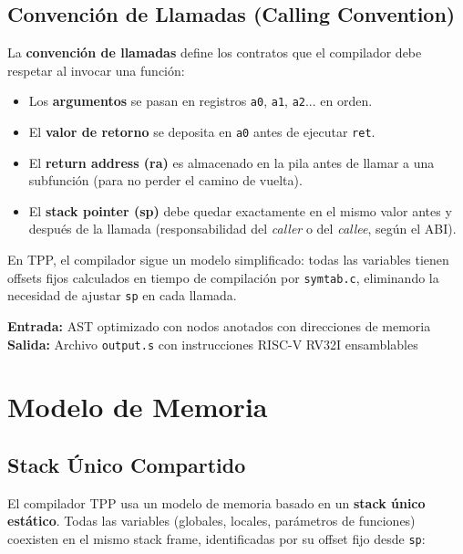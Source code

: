 \subsection{Convención de Llamadas (Calling Convention)}

La \textbf{convención de llamadas} define los contratos que el compilador debe respetar al invocar una función:
\begin{itemize}
    \item Los \textbf{argumentos} se pasan en registros \texttt{a0}, \texttt{a1}, \texttt{a2}... en orden.
    \item El \textbf{valor de retorno} se deposita en \texttt{a0} antes de ejecutar \texttt{ret}.
    \item El \textbf{return address (ra)} es almacenado en la pila antes de llamar a una subfunción (para no perder el camino de vuelta).
    \item El \textbf{stack pointer (sp)} debe quedar exactamente en el mismo valor antes y después de la llamada (responsabilidad del \textit{caller} o del \textit{callee}, según el ABI).
\end{itemize}

En TPP, el compilador sigue un modelo simplificado: todas las variables tienen offsets fijos calculados en tiempo de compilación por \texttt{symtab.c}, eliminando la necesidad de ajustar \texttt{sp} en cada llamada.

\begin{infobox}
\textbf{Entrada:} AST optimizado con nodos anotados con direcciones de memoria \\
\textbf{Salida:} Archivo \texttt{output.s} con instrucciones RISC-V RV32I ensamblables
\end{infobox}

\section{Modelo de Memoria}

\subsection{Stack Único Compartido}

El compilador TPP usa un modelo de memoria basado en un \textbf{stack único estático}. Todas las variables (globales, locales, parámetros de funciones) coexisten en el mismo stack frame, identificadas por su offset fijo desde \texttt{sp}:

